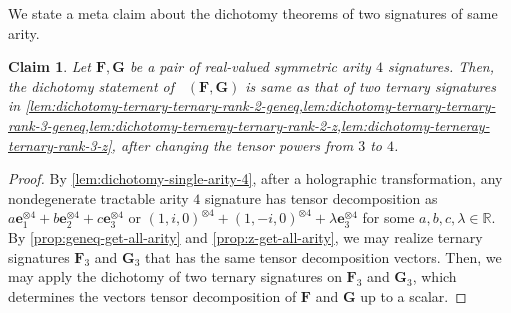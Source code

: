\documentclass[11pt]{article}
\newtheorem{claim}{Claim}
\DeclareMathOperator{\holts}{Holant^*_3}
\begin{document}
We state a meta claim about the dichotomy theorems of two signatures of same arity.
\begin{claim}\label{lem:meta-push-arity}
  Let $\mathbf{F}, \mathbf{G}$ be a pair of real-valued symmetric arity $4$ signatures.
  Then, the dichotomy statement of $\holts(\mathbf{F}, \mathbf{G})$ is same as that of two ternary signatures in \cref{lem:dichotomy-ternary-ternary-rank-2-geneq,lem:dichotomy-ternary-ternary-rank-3-geneq,lem:dichotomy-terneray-ternary-rank-2-z,lem:dichotomy-terneray-ternary-rank-3-z}, after changing the tensor powers from $3$ to $4$.
\end{claim}
\begin{proof}
  By \cref{lem:dichotomy-single-arity-4}, after a holographic transformation, any nondegenerate tractable arity $4$ signature has tensor decomposition as
  $a\mathbf{e}_1^{\otimes 4} + b\mathbf{e}_2^{\otimes 4} + c\mathbf{e}_3^{\otimes 4}$ or $(1, i, 0)^{\otimes 4} + (1, -i, 0)^{\otimes 4} + \lambda \mathbf{e}_3^{\otimes 4}$ for some $a, b, c, \lambda \in \mathbb{R}$.
By \cref{prop:geneq-get-all-arity} and \cref{prop:z-get-all-arity}, we may realize ternary signatures $\mathbf{F}_3$ and $\mathbf{G}_3$ that has the same tensor decomposition vectors.
Then, we may apply the dichotomy of two ternary signatures on $\mathbf{F}_3$ and $\mathbf{G}_3$, which determines the vectors tensor decomposition of $\mathbf{F}$ and $\mathbf{G}$ up to a scalar.
\end{proof}
\end{document}
